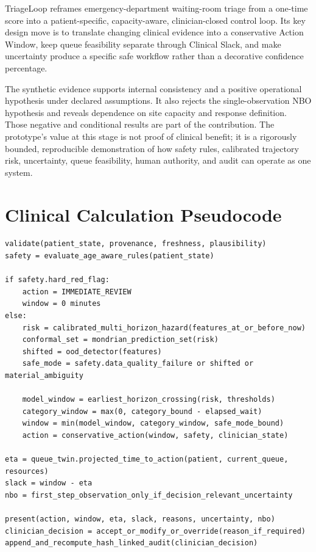 \documentclass[11pt,a4paper]{article}
\begin{document}
TriageLoop reframes emergency-department waiting-room triage from a one-time score into a patient-specific, capacity-aware, clinician-closed control loop. Its key design move is to translate changing clinical evidence into a conservative Action Window, keep queue feasibility separate through Clinical Slack, and make uncertainty produce a specific safe workflow rather than a decorative confidence percentage.

The synthetic evidence supports internal consistency and a positive operational hypothesis under declared assumptions. It also rejects the single-observation NBO hypothesis and reveals dependence on site capacity and response definition. Those negative and conditional results are part of the contribution. The prototype's value at this stage is not proof of clinical benefit; it is a rigorously bounded, reproducible demonstration of how safety rules, calibrated trajectory risk, uncertainty, queue feasibility, human authority, and audit can operate as one system.

\clearpage
\appendix

\section{Clinical Calculation Pseudocode}

\begin{lstlisting}
validate(patient_state, provenance, freshness, plausibility)
safety = evaluate_age_aware_rules(patient_state)

if safety.hard_red_flag:
    action = IMMEDIATE_REVIEW
    window = 0 minutes
else:
    risk = calibrated_multi_horizon_hazard(features_at_or_before_now)
    conformal_set = mondrian_prediction_set(risk)
    shifted = ood_detector(features)
    safe_mode = safety.data_quality_failure or shifted or material_ambiguity

    model_window = earliest_horizon_crossing(risk, thresholds)
    category_window = max(0, category_bound - elapsed_wait)
    window = min(model_window, category_window, safe_mode_bound)
    action = conservative_action(window, safety, clinician_state)

eta = queue_twin.projected_time_to_action(patient, current_queue, resources)
slack = window - eta
nbo = first_step_observation_only_if_decision_relevant_uncertainty

present(action, window, eta, slack, reasons, uncertainty, nbo)
clinician_decision = accept_or_modify_or_override(reason_if_required)
append_and_recompute_hash_linked_audit(clinician_decision)
\end{lstlisting}
\end{document}
